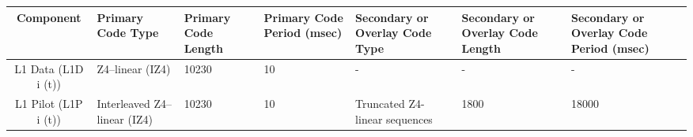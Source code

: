 \begin{tabular}{|c|p{1.5cm}|p{1.3cm}|p{1.5cm}|p{1.5cm}|p{1.5cm}|p{1.5cm}|}
\hline
\textbf{Component} & \textbf{Primary Code Type} & \textbf{Primary Code Length} & \textbf{Primary Code Period (msec)} & \textbf{Secondary or Overlay Code Type} & \textbf{Secondary or Overlay Code Length} & \textbf{Secondary or Overlay Code Period (msec)} \\
\hline
L1 Data (L1D i (t)) & Z4–linear (IZ4) & 10230 & 10 & - & - & - \\
\hline
L1 Pilot (L1P i (t)) & Interleaved Z4–linear (IZ4) & 10230 & 10 & Truncated Z4-linear sequences & 1800 & 18000 \\
\hline
\end{tabular}
